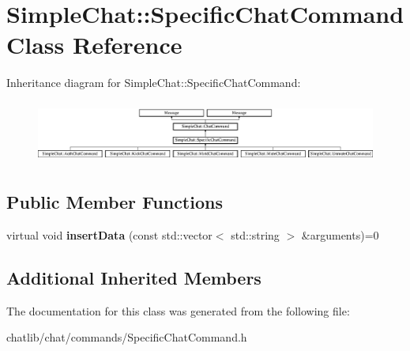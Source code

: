 \hypertarget{classSimpleChat_1_1SpecificChatCommand}{\section{Simple\-Chat\-:\-:Specific\-Chat\-Command Class Reference}
\label{classSimpleChat_1_1SpecificChatCommand}
}
Inheritance diagram for Simple\-Chat\-:\-:Specific\-Chat\-Command\-:\begin{figure}[H]
\begin{center}
\leavevmode
\includegraphics[height=2.074074cm]{classSimpleChat_1_1SpecificChatCommand}
\end{center}
\end{figure}
\subsection*{Public Member Functions}
\begin{DoxyCompactItemize}
\item 
\hypertarget{classSimpleChat_1_1SpecificChatCommand_a201ca79b92b4d5ad6ef78ddd39fc5aaa}{virtual void {\bfseries insert\-Data} (const std\-::vector$<$ std\-::string $>$ \&arguments)=0}\label{classSimpleChat_1_1SpecificChatCommand_a201ca79b92b4d5ad6ef78ddd39fc5aaa}

\end{DoxyCompactItemize}
\subsection*{Additional Inherited Members}


The documentation for this class was generated from the following file\-:\begin{DoxyCompactItemize}
\item 
chatlib/chat/commands/Specific\-Chat\-Command.\-h\end{DoxyCompactItemize}
